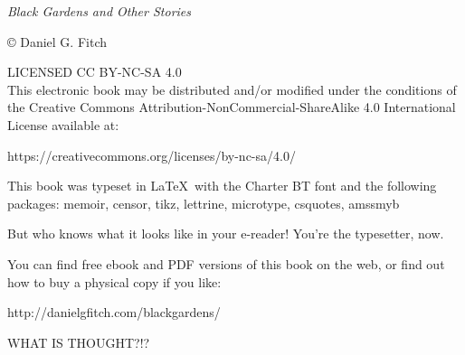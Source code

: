 \documentclass[letterpaper,12pt,oneside,openany]{memoir}
\begin{document}
\pagestyle{empty}


{
\clearpage
\null\vfill

\begin{flushleft}
{\small
\textit{Black Gardens and Other Stories}


© Daniel G. Fitch 

\bigskip


LICENSED CC BY-NC-SA 4.0 \\
This electronic book may be distributed and/or modified under the conditions of the Creative Commons Attribution-NonCommercial-ShareAlike 4.0 International License available at:
\begin{chatlog}
https://creativecommons.org/licenses/by-nc-sa/4.0/
\end{chatlog}

This book was typeset in \LaTeX\ with the Charter BT font and the following packages:
  memoir,
  censor,
  tikz,
  lettrine,
  microtype,
  csquotes,
  amssmyb

But who knows what it looks like in your e-reader! You're the typesetter, now.

\bigskip

You can find free ebook and PDF versions of this book on the web, or find out how to buy a physical copy if you like:
\begin{chatlog}
http://danielgfitch.com/blackgardens/
\end{chatlog}

\bigskip

WHAT IS THOUGHT?!?

}


\end{flushleft}
}


\frontmatter


\mainmatter
\raggedbottom

\pagestyle{plain}


























\end{document}
